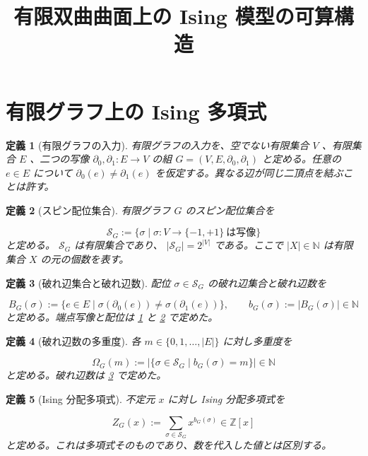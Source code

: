 \documentclass[11pt,a4paper]{article}
\title{有限双曲曲面上の Ising 模型の可算構造}
\author{}
\date{}
\newtheorem{definition}{定義}[section]
\theoremstyle{remark}
\begin{document}
\maketitle
\part{有限グラフ上の Ising 多項式}

\begin{definition}[有限グラフの入力]\label{lab:def_finite_graph_input}
有限グラフの入力を、空でない有限集合 
$V$
、有限集合 
$E$
、二つの写像 
$\partial_0,\partial_1:E\to V$
 の組 
$G=(V,E,\partial_0,\partial_1)$
 と定める。任意の 
$e\in E$
 について 
$\partial_0(e)\ne\partial_1(e)$
 を仮定する。異なる辺が同じ二頂点を結ぶことは許す。

\end{definition}

\begin{definition}[スピン配位集合]\label{lab:def_spin_configuration_set}
有限グラフ 
$G$
 のスピン配位集合を

\[\mathcal S_G:=\{\sigma\mid \sigma:V\to\{-1,+1\}\ \text{は写像}\}\]
と定める。
$\mathcal S_G$
 は有限集合であり、
$|\mathcal S_G|=2^{|V|}$
 である。ここで 
$|X|\in\mathbb N$
 は有限集合 
$X$
 の元の個数を表す。

\end{definition}

\begin{definition}[破れ辺集合と破れ辺数]\label{lab:def_broken_edge_set}
配位 
$\sigma\in\mathcal S_G$
 の破れ辺集合と破れ辺数を

\[B_G(\sigma):=\{e\in E\mid \sigma(\partial_0(e))\ne\sigma(\partial_1(e))\},\qquad b_G(\sigma):=|B_G(\sigma)|\in\mathbb N\]
と定める。端点写像と配位は 
\cref{lab:def_finite_graph_input}
 と 
\cref{lab:def_spin_configuration_set}
 で定めた。

\end{definition}

\begin{definition}[破れ辺数の多重度]\label{lab:def_broken_edge_multiplicity}
各 
$m\in\{0,1,\ldots,|E|\}$
 に対し多重度を

\[\Omega_G(m):=|\{\sigma\in\mathcal S_G\mid b_G(\sigma)=m\}|\in\mathbb N\]
と定める。破れ辺数は 
\cref{lab:def_broken_edge_set}
 で定めた。

\end{definition}

\begin{definition}[Ising 分配多項式]\label{lab:def_ising_partition_polynomial}
不定元 
$x$
 に対し Ising 分配多項式を

\[Z_G(x):=\sum_{\sigma\in\mathcal S_G}x^{b_G(\sigma)}\in\mathbb Z[x]\]
と定める。これは多項式そのものであり、数を代入した値とは区別する。

\end{definition}
\end{document}
